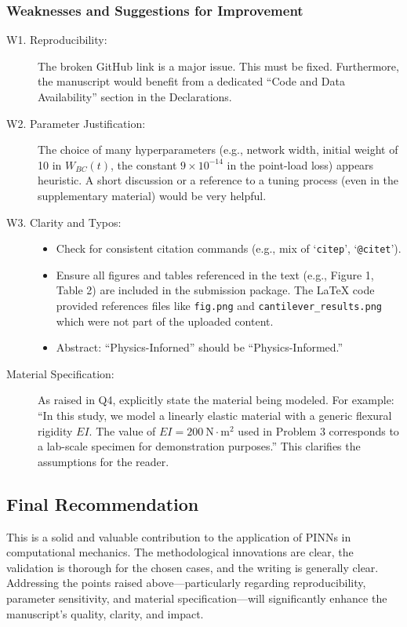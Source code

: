 \documentclass[11pt]{article}
\begin{document}
\subsubsection*{Weaknesses and Suggestions for Improvement}
\begin{description}
    \item[W1. Reproducibility:] The broken GitHub link is a major issue. This must be fixed. Furthermore, the manuscript would benefit from a dedicated ``Code and Data Availability'' section in the Declarations.
    
    \item[W2. Parameter Justification:] The choice of many hyperparameters (e.g., network width, initial weight of 10 in $W_{BC}(t)$, the constant $9\times10^{-14}$ in the point-load loss) appears heuristic. A short discussion or a reference to a tuning process (even in the supplementary material) would be very helpful.
    
    \item[W3. Clarity and Typos:]
    \begin{itemize}
        \item Check for consistent citation commands (e.g., mix of `\texttt{citep}', `\texttt{@citet}').
        \item Ensure all figures and tables referenced in the text (e.g., Figure 1, Table 2) are included in the submission package. The LaTeX code provided references files like \texttt{fig.png} and \texttt{cantilever\_results.png} which were not part of the uploaded content.
        \item Abstract: ``Physics-Inforned'' should be ``Physics-Informed.''
    \end{itemize}
    
    \item[Material Specification:] As raised in Q4, explicitly state the material being modeled. For example: ``In this study, we model a linearly elastic material with a generic flexural rigidity $EI$. The value of $EI=200\ \mathrm{N\cdot m^2}$ used in Problem 3 corresponds to a lab-scale specimen for demonstration purposes.'' This clarifies the assumptions for the reader.
\end{description}

\subsection*{Final Recommendation}
This is a solid and valuable contribution to the application of PINNs in computational mechanics. The methodological innovations are clear, the validation is thorough for the chosen cases, and the writing is generally clear. Addressing the points raised above—particularly regarding reproducibility, parameter sensitivity, and material specification—will significantly enhance the manuscript's quality, clarity, and impact.
\end{document}
